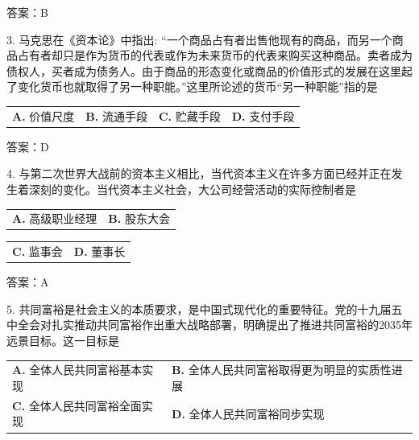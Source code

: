 \documentclass[UTF8,11pt]{ctexart}
\begin{document}
答案：B


3. 马克思在《资本论》中指出: “一个商品占有者出售他现有的商品，而另一个商品占有者却只是作为货币的代表或作为未来货币的代表来购买这种商品。卖者成为债权人，买者成为债务人。由于商品的形态变化或商品的价值形式的发展在这里起了变化货币也就取得了另一种职能。”这里所论述的货币“另一种职能”指的是


\begin{center}\begin{tabular}{>{\raggedright\arraybackslash}p{\dimexpr(\linewidth-8\tabcolsep)/4\relax}>{\raggedright\arraybackslash}p{\dimexpr(\linewidth-8\tabcolsep)/4\relax}>{\raggedright\arraybackslash}p{\dimexpr(\linewidth-8\tabcolsep)/4\relax}>{\raggedright\arraybackslash}p{\dimexpr(\linewidth-8\tabcolsep)/4\relax}}
\textbf{A.} 价值尺度 & \textbf{B.} 流通手段 & \textbf{C.} 贮藏手段 & \textbf{D.} 支付手段\\[.35em]\end{tabular}\end{center}

答案：D


4. 与第二次世界大战前的资本主义相比，当代资本主义在许多方面已经并正在发生着深刻的变化。当代资本主义社会，大公司经营活动的实际控制者是


\begin{center}\begin{tabular}{>{\raggedright\arraybackslash}p{\dimexpr(\linewidth-4\tabcolsep)/2\relax}>{\raggedright\arraybackslash}p{\dimexpr(\linewidth-4\tabcolsep)/2\relax}}
\textbf{A.} 高级职业经理 & \textbf{B.} 股东大会\\[.35em]\end{tabular}\end{center}

\begin{center}\begin{tabular}{>{\raggedright\arraybackslash}p{\dimexpr(\linewidth-4\tabcolsep)/2\relax}>{\raggedright\arraybackslash}p{\dimexpr(\linewidth-4\tabcolsep)/2\relax}}
\textbf{C.} 监事会 & \textbf{D.} 董事长\\[.35em]\end{tabular}\end{center}

答案：A


5. 共同富裕是社会主义的本质要求，是中国式现代化的重要特征。党的十九届五中全会对扎实推动共同富裕作出重大战略部署，明确提出了推进共同富裕的2035年远景目标。这一目标是


\begin{center}\begin{tabular}{>{\raggedright\arraybackslash}p{\dimexpr(\linewidth-4\tabcolsep)/2\relax}>{\raggedright\arraybackslash}p{\dimexpr(\linewidth-4\tabcolsep)/2\relax}}
\textbf{A.} 全体人民共同富裕基本实现 & \textbf{B.} 全体人民共同富裕取得更为明显的实质性进展\\[.35em]
\textbf{C.} 全体人民共同富裕全面实现 & \textbf{D.} 全体人民共同富裕同步实现\\[.35em]\end{tabular}\end{center}
\end{document}
